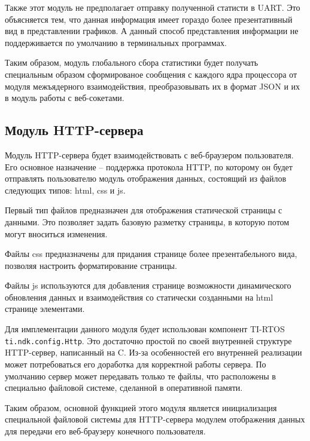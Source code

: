 
Также этот модуль не предполагает отправку полученной статисти в UART.
Это объясняется тем, что данная информация имеет гораздо более презентативный
вид в представлении графиков. А данный способ представления информации
не поддерживается по умолчанию в терминальных программах.

Таким образом, модуль глобального сбора статистики будет получать специальным
образом сформированое сообщения с каждого ядра процессора от модуля межъядерного
взаимодействия, преобразовывать их в формат JSON и их в модуль работы
с веб-сокетами.

\subsection{Модуль HTTP-сервера}

Модуль HTTP-сервера будет взаимодействовать с веб-браузером пользователя.
Его основное назначение -- поддержка протокола HTTP, по которому он будет
отправлять пользователю модуль отображения данных, состоящий из файлов
следующих типов: html, css и js.


Первый тип файлов предназначен для отображения статической страницы с данными.
Это позволяет задать базовую разметку страницы, в которую потом могут вноситься
изменения.

Файлы css предназначены для придания странице более презентабельного вида,
позволяя настроить форматирование страницы.

Файлы js используются для добавления странице возможности динамического обновления
данных и взаимодействия со статически созданными на html странице элементами.

Для имплементации данного модуля будет использован компонент TI-RTOS
\texttt{ti.ndk.config.Http}. Это достаточно простой по своей внутренней
структуре HTTP-сервер, написанный на C. Из-за особенностей его внутренней
реализации может потребоваться его доработка для корректной работы сервера.
По умолчанию сервер может передавать только те файлы, что расположены
в специально файловой системе, сделанной в оперативной памяти.

Таким образом, основной функцией этого модуля является инициализация специальной
файловой системы для HTTP-сервера модулем отображения данных для передачи его
веб-браузеру конечного пользователя.


